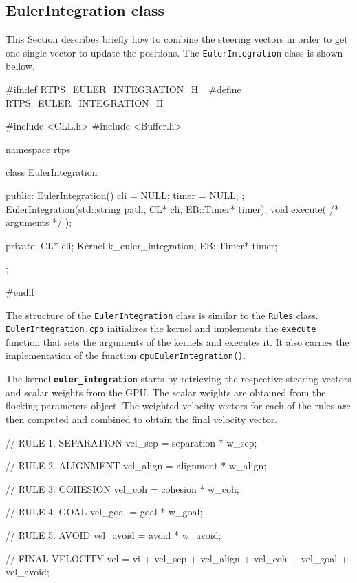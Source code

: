 


\subsection{EulerIntegration class} \label{eulerclass}
This Section describes briefly how to combine the steering vectors in order to get one single vector to update the positions. The \texttt{EulerIntegration} class is shown bellow.

\begin{cppcode}{0}
#ifndef RTPS_EULER_INTEGRATION_H_
#define RTPS_EULER_INTEGRATION_H_

#include <CLL.h>
#include <Buffer.h>

namespace rtps
{
	class EulerIntegration
	{
		public:
			EulerIntegration() { cli = NULL; timer = NULL; };
	 		EulerIntegration(std::string path, CL* cli, EB::Timer* timer);
			void execute( /* arguments */ );

		private:
			CL* cli;
			Kernel k_euler_integration;
			EB::Timer* timer;
	};
}
#endif
\end{cppcode}

The structure of the \texttt{EulerIntegration} class is similar to the \texttt{Rules} class. \texttt{EulerIntegration.cpp} initializes the kernel and implements the \texttt{execute} function that sets the arguments of the kernels and executes it. It also carries the implementation of the function \texttt{cpuEulerIntegration()}. 

The kernel \texttt{\textbf{euler\_integration}} starts by retrieving the respective steering vectors and scalar weights from the GPU. The scalar weights are obtained from the flocking parameters object. The weighted velocity vectors for each of the rules are then computed and combined to obtain the final velocity vector.

\begin{cppcode}{0}
// RULE 1. SEPARATION
vel_sep = separation * w_sep;
   
// RULE 2. ALIGNMENT
vel_align = alignment * w_align;

// RULE 3. COHESION
vel_coh = cohesion * w_coh;

// RULE 4. GOAL
vel_goal = goal * w_goal;

// RULE 5. AVOID
vel_avoid = avoid * w_avoid;

// FINAL VELOCITY
vel = vi + vel_sep + vel_align + vel_coh + vel_goal + vel_avoid;
\end{cppcode}

